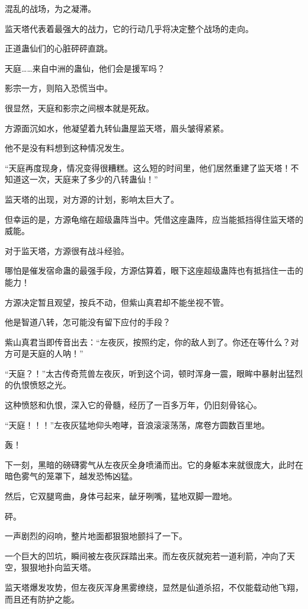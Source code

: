 \begin{this_body}
混乱的战场，为之凝滞。

监天塔代表着最强大的战力，它的行动几乎将决定整个战场的走向。

正道蛊仙们的心脏砰砰直跳。

天庭……来自中洲的蛊仙，他们会是援军吗？

影宗一方，则陷入恐慌当中。

很显然，天庭和影宗之间根本就是死敌。

方源面沉如水，他凝望着九转仙蛊屋监天塔，眉头皱得紧紧。

他不是没有料想到这种情况发生。

“天庭再度现身，情况变得很糟糕。这么短的时间里，他们居然重建了监天塔！不知道这一次，天庭来了多少的八转蛊仙！”

监天塔的出现，对方源的计划，影响太巨大了。

但幸运的是，方源龟缩在超级蛊阵当中。凭借这座蛊阵，应当能抵挡得住监天塔的威能。

对于监天塔，方源很有战斗经验。

哪怕是催发宿命蛊的最强手段，方源估算着，眼下这座超级蛊阵也有抵挡住一击的能力！

方源决定暂且观望，按兵不动，但紫山真君却不能坐视不管。

他是智道八转，怎可能没有留下应付的手段？

紫山真君当即传音出去：“左夜灰，按照约定，你的敌人到了。你还在等什么？对方可是天庭的人呐！”

“天庭？！”太古传奇荒兽左夜灰，听到这个词，顿时浑身一震，眼眸中暴射出猛烈的仇恨愤怒之光。

这种愤怒和仇恨，深入它的骨髓，经历了一百多万年，仍旧刻骨铭心。

“天庭！！！”左夜灰猛地仰头咆哮，音浪滚滚荡荡，席卷方圆数百里地。

轰！

下一刻，黑暗的磅礴雾气从左夜灰全身喷涌而出。它的身躯本来就很庞大，此时在暗色雾气的笼罩下，越发恐怖凶猛。

然后，它双腿弯曲，身体弓起来，龇牙咧嘴，猛地双脚一蹬地。

砰。

一声剧烈的闷响，整片地面都狠狠地颤抖了一下。

一个巨大的凹坑，瞬间被左夜灰踩踏出来。而左夜灰就宛若一道利箭，冲向了天空，狠狠地扑向监天塔。

监天塔爆发攻势，但左夜灰浑身黑雾缭绕，显然是仙道杀招，不仅能载动他飞翔，而且还有防护之能。


\end{this_body}
